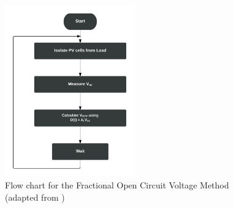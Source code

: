 {  \begin{figure}[H]
        \begin{center}
        \includegraphics[width=0.5\textwidth]{images/Vopen_circuit_Flow}       %
        \caption{ Flow chart for the Fractional Open Circuit Voltage Method (adapted from \cite{reza2013classification})}
        \label{fig:focflow}
        \end{center}
        \end{figure}
  
}
